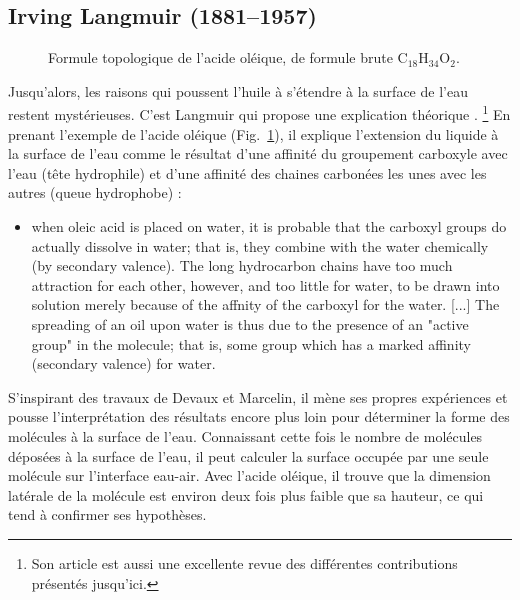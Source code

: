 \documentclass[12pt,a4paper]{article}
\begin{document}
\subsection{Irving Langmuir (1881--1957)}

\begin{figure}
\center
{}
\caption{Formule topologique de l'acide oléique, de formule brute $\text{C}_\text{18}\text{H}_\text{34}\text{O}_\text{2}$.}
\label{fig:acide_oleique}
\end{figure}

Jusqu'alors, les raisons qui poussent l'huile à s'étendre à la surface de l'eau restent mystérieuses.
C'est Langmuir qui propose une explication théorique \cite{Langmuir1917}.
\footnote{Son article est aussi une excellente revue des différentes contributions présentés jusqu'ici.}
En prenant l'exemple de l'acide oléique (Fig.~\ref{fig:acide_oleique}), il explique l'extension du liquide à la surface de l'eau comme le résultat d'une affinité du groupement carboxyle avec l'eau (tête hydrophile) et d'une affinité des chaines carbonées les unes avec les autres (queue hydrophobe) :
\begin{itemize}
\item[]
\og [...] when oleic acid is placed on water, it is probable that the carboxyl groups do actually dissolve in water; that is, they combine with the water chemically (by secondary valence). The long hydrocarbon chains have too much attraction for each other, however, and too little for water, to be drawn into solution merely because of the affnity of the carboxyl for the water.
[...]
The spreading of an oil upon water is thus due to the presence of an "active group" in the molecule; that is, some group which has a marked affinity (secondary valence) for water.
\fg{} 
\end{itemize}

S'inspirant des travaux de Devaux et Marcelin, il mène ses propres expériences et pousse l'interprétation des résultats encore plus loin pour déterminer la forme des molécules à la surface de l'eau.
Connaissant cette fois le nombre de molécules déposées à la surface de l'eau, il peut calculer la surface occupée par une seule molécule sur l'interface eau-air.
Avec l'acide oléique, il trouve que la dimension latérale de la molécule est environ deux fois plus faible que sa hauteur, ce qui tend à confirmer ses hypothèses.
\end{document}
